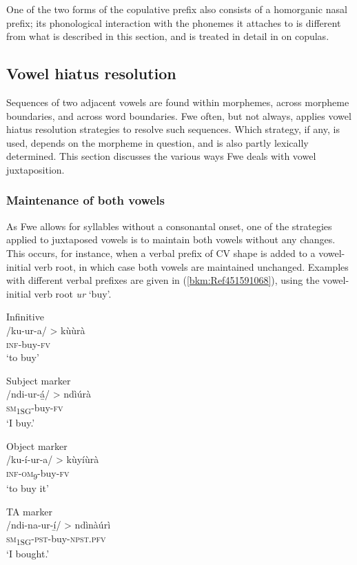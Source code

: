 One of the two forms of the copulative prefix also consists of a homorganic nasal prefix; its phonological interaction with the pho\-nemes it attaches to is different from what is described in this section, and is treated in detail in  on copulas.

\subsection{Vowel hiatus resolution}
\label{bkm:Ref491962181}\hypertarget{Toc75352613}{}
Sequences of two adjacent vowels are found within morphemes, across morpheme boundaries, and across word boundaries. Fwe often, but not always, applies vowel hiatus resolution strategies to resolve such sequences. Which strategy, if any, is used, depends on the morpheme in question, and is also partly lexically determined. This section discusses the various ways Fwe deals with vowel juxtaposition.

\subsubsection{Maintenance of both vowels}

As Fwe allows for syllables without a consonantal onset, one of the strategies applied to juxta\-posed vowels is to maintain both vowels without any changes. This occurs, for instance, when a verbal prefix of CV shape is added to a vowel-initial verb root, in which case both vowels are maintained unchanged. Exam\-ples with different verbal prefixes are given in (\ref{bkm:Ref451591068}), using the vowel-initial verb root \textit{ur} ‘buy’.

\ea
\label{bkm:Ref451591068}
Infinitive\\
/ku-ur-a/ > kùùrà\\
\textsc{inf}-buy-\textsc{fv}\\
\glt ‘to buy’
\z

\ea
Subject marker\\
/ndi-ur-á̲/ > ndìúrà\\
\textsc{sm}\textsubscript{1SG}-buy-\textsc{fv}\\
\glt ‘I buy.’
\z

\ea
Object marker\\
/ku-í-ur-a/ > kùyíùrà\\
\textsc{inf}-\textsc{om}\textsubscript{9}-buy-\textsc{fv}\\
\glt ‘to buy it’
\z

\newpage
\ea
TA marker\\
/ndi-na-ur-í̲/ > ndìnàúrì\\
\textsc{sm}\textsubscript{1SG}-\textsc{pst}-buy-\textsc{npst}.\textsc{pfv}\\
\glt ‘I bought.’
\z

